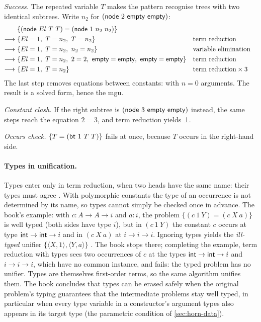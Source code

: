 \begin{tutorial}
\emph{Success.} The repeated variable $T$ makes the pattern recognise trees with two identical subtrees.
Write $n_2$ for $(\cst{node}\ 2\ \cst{empty}\ \cst{empty})$:
\begin{align*}
 & \{(\cst{node}\ El\ T\ T) = (\cst{node}\ 1\ n_2\ n_2)\}\\
 \longrightarrow\ & \{El=1,\ T=n_2,\ T=n_2\} && \text{term reduction}\\
 \longrightarrow\ & \{El=1,\ T=n_2,\ n_2=n_2\} && \text{variable elimination}\\
 \longrightarrow\ & \{El=1,\ T=n_2,\ 2=2,\ \cst{empty}=\cst{empty},\ \cst{empty}=\cst{empty}\} && \text{term reduction}\\
 \longrightarrow\ & \{El=1,\ T=n_2\} && \text{term reduction}\times 3
\end{align*}
The last step removes equations between constants:  with $n=0$ arguments. The
result is a solved form, hence the mgu.

\emph{Constant clash.} If the right subtree is $(\mathsf{node}\ 3\ \mathsf{empty}\ \mathsf{empty})$ instead, the same
steps reach the equation $2=3$, and term reduction yields $\bot$.

\emph{Occurs check.} $\{T=(\cst{bt}\ 1\ T\ T)\}$ fails at once, because $T$ occurs in the right-hand side.
\end{tutorial}

\paragraph{Types in unification.} Types enter only in term reduction, when two heads have the same name:
their types must agree . With polymorphic constants the type of an occurrence is not
determined by its name, so types cannot simply be checked once in advance. The book's example: with
$c:A\to A\to i$ and $a:i$, the problem $\{(c\ 1\ Y)=(c\ X\ a)\}$ is well typed (both sides have type $i$),
but in $(c\ 1\ Y)$ the constant $c$ occurs at type $\mathsf{int}\to\mathsf{int}\to i$ and in $(c\ X\ a)$ at
$i\to i\to i$. Ignoring types yields the \emph{ill-typed} unifier $\{\langle X,1\rangle,\langle Y,a\rangle\}$
. The book stops there; completing the example, term reduction with types sees two occurrences
of $c$ at the types $\mathsf{int}\to\mathsf{int}\to i$ and $i\to i\to i$, which have no common instance, and
fails: the typed problem has no unifier. Types are
themselves first-order terms, so the same algorithm unifies them. The book concludes  that types
can be erased safely when the original problem's typing guarantees that the intermediate problems stay
well typed, in particular when every type variable in a constructor's argument types also appears in its
target type (the parametric condition of \cref{sec:horn-data}).

